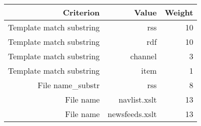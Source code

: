 \begin{tabular}{|r|r|r|}
\hline
\bf Criterion&\bf Value&\bf Weight\\
\hline
Template match substring&rss&10\\
\hline
Template match substring&rdf&10\\
\hline
Template match substring&channel&3\\
\hline
Template match substring&item&1\\
\hline
File name_substr&rss&8\\
\hline
File name&navlist.xslt&13\\
\hline
File name&newsfeeds.xslt&13\\
\hline
\end{tabular}
